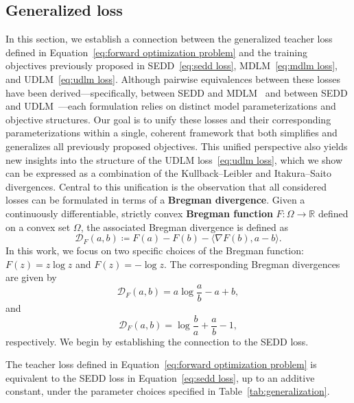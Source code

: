     \subsection{Generalized loss}
    \label{app: generalized loss}
        In this section, we establish a connection between the generalized teacher loss defined in Equation~\eqref{eq:forward optimization problem} and the training objectives previously proposed in SEDD~\eqref{eq:sedd loss}, MDLM~\eqref{eq:mdlm loss}, and UDLM~\eqref{eq:udlm loss}. Although pairwise equivalences between these losses have been derived—specifically, between SEDD and MDLM~\citep[Appendix C]{sahoo2024simple} and between SEDD and UDLM~\citep[Appendix C]{schiff2024discreteguidance}—each formulation relies on distinct model parameterizations and objective structures. Our goal is to unify these losses and their corresponding parameterizations within a single, coherent framework that both simplifies and generalizes all previously proposed objectives. This unified perspective also yields new insights into the structure of the UDLM loss~\eqref{eq:udlm loss}, which we show can be expressed as a combination of the Kullback--Leibler and Itakura--Saito divergences. Central to this unification is the observation that all considered losses can be formulated in terms of a \textbf{Bregman divergence}. Given a continuously differentiable, strictly convex \textbf{Bregman function} $F : \Omega \to \mathbb{R}$ defined on a convex set $\Omega$, the associated Bregman divergence is defined as
        \begin{equation}
        \label{eq:bregman divergence}
            \mathcal{D}_{F}(a, b) \coloneqq F(a) - F(b) - \langle \nabla F(b), a - b \rangle.
        \end{equation}
        In this work, we focus on two specific choices of the Bregman function: $F(z) = z \log z$ and $F(z) = -\log z$. The corresponding Bregman divergences are given by
        \begin{equation}
        \label{eq:bregman likelihood}
            \mathcal{D}_{F}(a, b) = a \log \frac{a}{b} - a + b,
        \end{equation}
        and
        \begin{equation}
            \mathcal{D}_{F}(a, b) = \log \frac{b}{a} + \frac{a}{b} - 1, 
        \end{equation}
        respectively. 
        We begin by establishing the connection to the SEDD loss.
        \begin{proposition}
            The teacher loss defined in Equation~\eqref{eq:forward optimization problem} is equivalent to the SEDD loss in Equation~\eqref{eq:sedd loss}, up to an additive constant, under the parameter choices specified in Table~\ref{tab:generalization}. 
        \end{proposition}
